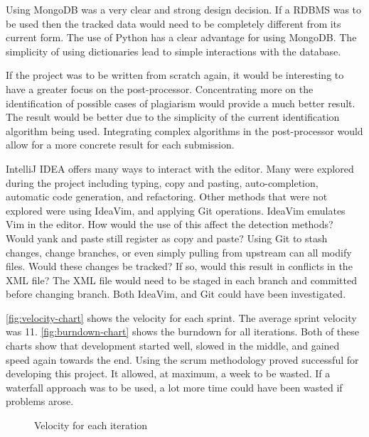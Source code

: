 Using MongoDB was a very clear and strong design decision. If a RDBMS was to be used then the tracked data would need to be completely different from its current form. The use of Python has a clear advantage for using MongoDB. The simplicity of using dictionaries lead to simple interactions with the database.

If the project was to be written from scratch again, it would be interesting to have a greater focus on the post-processor. Concentrating more on the identification of possible cases of plagiarism would provide a much better result. The result would be better due to the simplicity of the current identification algorithm being used. Integrating complex algorithms in the post-processor would allow for a more concrete result for each submission.

IntelliJ IDEA offers many ways to interact with the editor. Many were explored during the project including typing, copy and pasting, auto-completion, automatic code generation, and refactoring. Other methods that were not explored were using IdeaVim, and applying Git operations. IdeaVim emulates Vim in the editor. How would the use of this affect the detection methods? Would yank and paste still register as copy and paste? Using Git to stash changes, change branches, or even simply pulling from upstream can all modify files. Would these changes be tracked? If so, would this result in conflicts in the XML file? The XML file would need to be staged in each branch and committed before changing branch. Both IdeaVim, and Git could have been investigated.

\autoref{fig:velocity-chart} shows the velocity for each sprint. The average sprint velocity was 11. \autoref{fig:burndown-chart} shows the burndown for all iterations. Both of these charts show that development started well, slowed in the middle, and gained speed again towards the end. Using the scrum methodology proved successful for developing this project. It allowed, at maximum, a week to be wasted. If a waterfall approach was to be used, a lot more time could have been wasted if problems arose.

\begin{figure}[H]
  \centering
  \caption[Velocity chart]{Velocity for each iteration}
  \label{fig:velocity-chart}
\end{figure}

